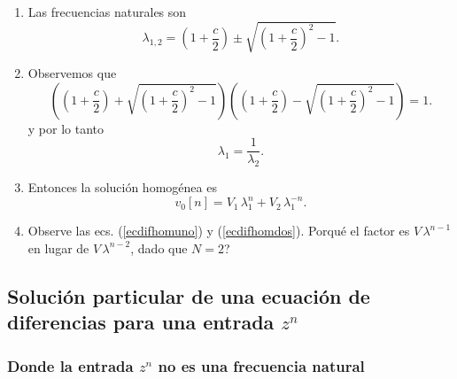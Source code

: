 \begin{enumerate}
\item Las frecuencias naturales son 
\begin{equation}
        \lambda_{1,2}=\left( 1+\frac{c}{2}\right) \pm \sqrt{\left( 1+\frac{c}{2}\right)^{2}-1}.
\end{equation}

\item Observemos que
\begin{equation}
        \left( 
                \left( 1+\frac{c}{2}\right) +
                \sqrt{\left( 1+\frac{c}{2}\right)^{2}-1}
        \right) 
        \left( \left( 1+\frac{c}{2}\right) -\sqrt{\left( 1+\frac{c}{2}\right) ^{2}-1}
        \right) =1.
\end{equation}
y por lo tanto 
\begin{equation}
        \lambda _{1}=\frac{1}{\lambda _{2}}.
\end{equation}

\item Entonces la soluci\'{o}n homog\'{e}nea es 
\begin{equation}
        v_{0}\left[ n\right] = V_{1} \, \lambda _{1}^n+ V_{2} \, \lambda _{1}^{-n}.
\end{equation}

\item Observe las ecs. (\ref{ecdifhomuno}) y (\ref{ecdifhomdos}). 
\textquestiondown Porqu\'{e} el factor es $V \, \lambda^{n-1}$ en lugar de $V \, \lambda^{n-2}$, 
dado que $N=2$?
\end{enumerate}

\subsection{Soluci\'{o}n particular de una ecuaci\'{o}n de diferencias para una entrada $z^{n}$}

\subsubsection{Donde la entrada $z^{n}$ no es una frecuencia natural}

